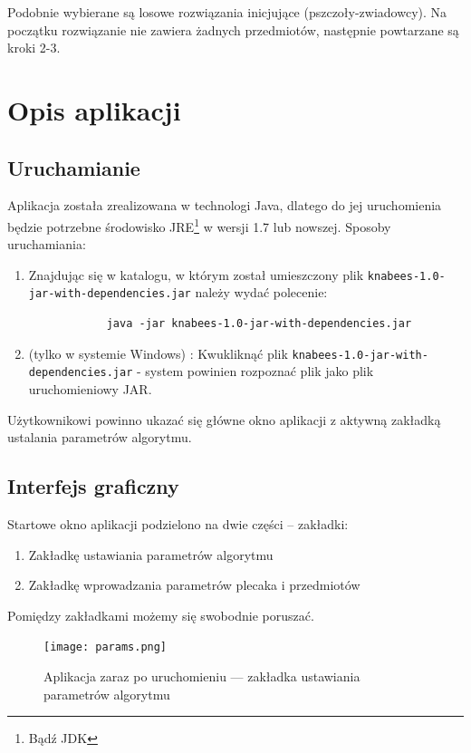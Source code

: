 \documentclass[a4paper,12pt,notitlepage]{mwrep}
\begin{document}
Podobnie wybierane są losowe rozwiązania inicjujące (pszczoły-zwiadowcy).
Na początku rozwiązanie nie zawiera żadnych przedmiotów, następnie powtarzane są kroki 2-3.

\chapter{Opis aplikacji}
\section{Uruchamianie}
Aplikacja została zrealizowana w technologi Java, dlatego do jej uruchomienia będzie
potrzebne środowisko JRE\footnote{Bądź JDK} w wersji 1.7 lub nowszej.
Sposoby uruchamiania:
\begin{enumerate}
	\item	Znajdując się w katalogu, w którym został umieszczony plik \texttt{knabees-1.0-jar-with-dependencies.jar}
			należy wydać polecenie:
			\begin{verbatim}
			java -jar knabees-1.0-jar-with-dependencies.jar
			\end{verbatim}
	\item	(tylko w systemie Windows) : Kwukliknąć plik \texttt{knabees-1.0-jar-with-dependencies.jar}
			- system powinien rozpoznać plik jako plik uruchomieniowy JAR.
\end{enumerate}
Użytkownikowi powinno ukazać się główne okno aplikacji z aktywną zakładką ustalania parametrów
algorytmu.

\section{Interfejs graficzny}
Startowe okno aplikacji podzielono na dwie części -- zakładki:
\begin{enumerate}
	\item	Zakładkę ustawiania parametrów algorytmu
	\item	Zakładkę wprowadzania parametrów plecaka i przedmiotów
\end{enumerate}
Pomiędzy zakładkami możemy się swobodnie poruszać.
\begin{figure}[H]
\centering
\texttt{[image: params.png]}
\caption{Aplikacja zaraz po uruchomieniu --- zakładka ustawiania parametrów algorytmu}
\label{fig:params}
\end{figure}
\end{document}
